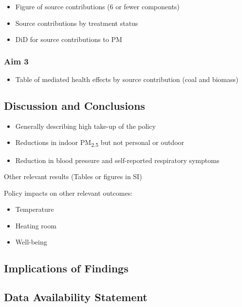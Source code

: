\documentclass[
  letterpaper,
  DIV=11,
  numbers=noendperiod]{scrartcl}
\providecommand{\tightlist}{%
  \setlength{\itemsep}{0pt}\setlength{\parskip}{0pt}}\usepackage{longtable,booktabs,array}
\begin{document}
\begin{itemize}
\tightlist
\item
  Figure of source contributions (6 or fewer components)
\item
  Source contributions by treatment status
\item
  DiD for source contributions to PM
\end{itemize}

\subsubsection{Aim 3}\label{aim-3}

\begin{itemize}
\tightlist
\item
  Table of mediated health effects by source contribution (coal and
  biomass)
\end{itemize}

\subsection{Discussion and
Conclusions}\label{discussion-and-conclusions}

\begin{itemize}
\tightlist
\item
  Generally describing high take-up of the policy
\item
  Reductions in indoor PM\textsubscript{2.5} but not personal or outdoor
\item
  Reduction in blood pressure and self-reported respiratory symptoms
\end{itemize}

Other relevant results (Tables or figures in SI)

Policy impacts on other relevant outcomes:

\begin{itemize}
\tightlist
\item
  Temperature
\item
  Heating room
\item
  Well-being
\end{itemize}

\subsection{Implications of Findings}\label{implications-of-findings}

\subsection{Data Availability
Statement}\label{data-availability-statement}
\end{document}
